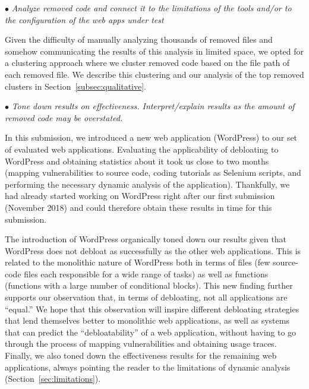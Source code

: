 \vspace{1ex}

\noindent $\bullet$ \textit{Analyze removed code and connect it to the limitations of the tools and/or to the configuration of the web apps under test}
\vspace{0.5ex}

\noindent Given the difficulty of manually analyzing thousands of removed files and somehow communicating the results of this analysis in limited space, we opted for a clustering approach where we cluster removed code based on the file path of each removed file. We describe this clustering and our analysis of the top removed clusters in Section~\ref{subsec:qualitative}.

\vspace{1ex}

\noindent $\bullet$ \textit{Tone down results on effectiveness. Interpret/explain results as the amount of removed code may be overstated.}
\vspace{0.5ex}

\noindent In this submission, we introduced a new web application (WordPress) to our set of evaluated web applications. Evaluating the applicability of debloating to WordPress and obtaining statistics about it took us close to two months (mapping vulnerabilities to source code, coding tutorials as Selenium scripts, and performing the necessary dynamic analysis of the application). Thankfully, we had already started working on WordPress right after our first submission (November 2018) and could therefore obtain these results in time for this submission.

The introduction of WordPress organically toned down our results given that WordPress does not debloat as successfully as the other web applications. This is related to the monolithic nature of WordPress both in terms of files (few source-code files each responsible for a wide range of tasks) as well as functions (functions with a large number of conditional blocks). This new finding further supports our observation that, in terms of debloating, not all applications are ``equal.'' We hope that this observation will inspire different debloating strategies that lend themselves better to monolithic web applications, as well as systems that can predict the ``debloatability'' of a web application, without having to go through the process of mapping vulnerabilities and obtaining usage traces. Finally, we also toned down the effectiveness results for the remaining web applications, always pointing the reader to the limitations of dynamic analysis (Section~\ref{sec:limitations}).


